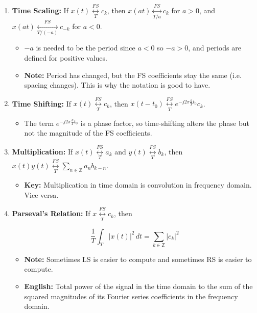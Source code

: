 \begin{definition}
\begin{enumerate}
        \item \textbf{Time Scaling:} If \( x(t) \underset{T}{\overset{FS}{\longleftrightarrow}} c_k \), then \( x(at) \underset{T/a}{\overset{FS}{\longleftrightarrow}}c_k \) for \( a > 0 \), and \( x(at) \underset{T/(-a)}{\overset{FS}{\longleftrightarrow}} c_{-k} \) for \( a < 0 \).
        \begin{itemize}
            \item $-a$ is needed to be the period since $a<0$ so $-a>0$, and periods are defined for positive values. 
            \item \textbf{Note:} Period has changed, but the FS coefficients stay the same (i.e. spacing changes). This is why the notation is good to have. 
        \end{itemize}
    
        \item \textbf{Time Shifting:} If \( x(t) \underset{T}{\overset{FS}{\longleftrightarrow}} c_k \), then \( x(t - t_0) \underset{T}{\overset{FS}{\longleftrightarrow}}  e^{-j 2\pi \frac{k}{T} t_0} c_k \).
        \begin{itemize}
            \item The term \( e^{-j 2\pi \frac{k}{T} t_0} \) is a phase factor, so time-shifting alters the phase but not the magnitude of the FS coefficients.
        \end{itemize}
    
        \item \textbf{Multiplication:} If \( x(t) \underset{T}{\overset{FS}{\longleftrightarrow}} a_k \) and \( y(t) \underset{T}{\overset{FS}{\longleftrightarrow}} b_k \), then \( x(t) y(t) \underset{T}{\overset{FS}{\longleftrightarrow}} \sum_{n \in \mathbb{Z}} a_n b_{k-n} \).
        \begin{itemize}
            \item \textbf{Key:} Multiplication in time domain is convolution in frequency domain. Vice versa.
        \end{itemize}
        \item \textbf{Parseval's Relation:} If \( x \underset{T}{\overset{FS}{\longleftrightarrow}} c_k \), then

        \[
        \frac{1}{T} \int_{T} |x(t)|^2 \, dt = \sum_{k \in \mathbb{Z}} |c_k|^2
        \]
        \begin{itemize}
            \item \textbf{Note:} Sometimes LS is easier to compute and sometimes RS is easier to compute. 
            \item \textbf{English:} Total power of the signal in the time domain to the sum of the squared magnitudes of its Fourier series coefficients in the frequency domain.
        \end{itemize}


\end{enumerate}
\end{definition}
